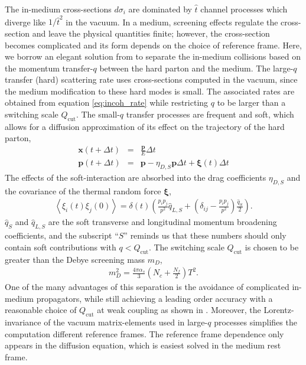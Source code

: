 \documentclass[aps, prc, reprint, amsmath, groupedaddress, nofootinbib]{revtex4-1}
\begin{document}
The in-medium cross-sections $d\sigma_i$ are dominated by $\hat{t}$ channel processes which diverge like $1/\hat{t}^2$ in the vacuum.
In a medium, screening effects regulate the cross-section and leave the physical quantities finite; however, the cross-section becomes complicated and its form depends on the choice of reference frame.
Here, we borrow an elegant solution from \cite{Ghiglieri:2015ala} to separate the in-medium collisions based on the momentum transfer-$q$ between the hard parton and the medium.
The large-$q$ transfer (hard) scattering rate uses cross-sections computed in the vacuum, since the medium modification to these hard modes is small.
The associated rates are obtained from equation \ref{eq:incoh_rate} while restricting $q$ to be larger than a switching scale $Q_{\textrm{cut}}$.
The small-$q$ transfer processes are frequent and soft, which allows for a diffusion approximation of its effect on the trajectory of the hard parton,
\begin{eqnarray}
\mathbf{x}(t+\Delta t) &=& \frac{\mathbf{p}}{E}\Delta t\\
\mathbf{p}(t+\Delta t) &=& \mathbf{p} - \eta_{D,S} \mathbf{p} \Delta t + \mathbf{\xi}(t) \Delta t
\end{eqnarray}
The effects of the soft-interaction are absorbed into the drag coefficients $\eta_{D,S}$ and the covariance of the thermal random force $\mathbf{\xi}$,
\begin{eqnarray}
\left\langle\xi_i(t)\xi_j(0)\right\rangle = \delta(t) \left(
\frac{p_i p_j}{p^2}\hat{q}_{L,S} + \left(
\delta_{ij}-\frac{p_i p_j}{p^2}
\right)\frac{\hat{q}_S}{2} 
\right).
\end{eqnarray}
$\hat{q}_S$ and $\hat{q}_{L,S}$ are the soft transverse and longitudinal momentum broadening coefficients, and the subscript ``$S$'' reminds us that these numbers should only contain soft contributions with $q<Q_{\textrm{cut}}$.
The switching scale $Q_{\textrm{cut}}$ is chosen to be greater than the Debye screening mass $m_D$,
\begin{eqnarray}
m_D^2 = \frac{4\pi \alpha_s}{3}\left(N_c+\frac{N_f}{2}\right) T^2.
\end{eqnarray}
One of the many advantages of this separation is the avoidance of complicated in-medium propagators, while still achieving a leading order accuracy with a reasonable choice of $Q_{\textrm{cut}}$ at weak coupling as shown in \cite{Ghiglieri:2015ala}.
Moreover, the Lorentz-invariance of the vacuum matrix-elements used in large-$q$ processes simplifies the computation different reference frames. The reference frame dependence only appears in the diffusion equation, which is easiest solved in the medium rest frame.
\end{document}
